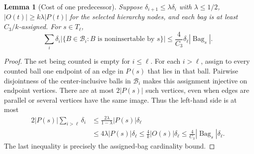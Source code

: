 \documentclass[11pt]{amsart}
\newtheorem{lemma}[theorem]{Lemma}
\theoremstyle{definition}
\theoremstyle{remark}
\numberwithin{equation}{section}
\begin{document}
\begin{lemma}[Cost of one predecessor]\label{ha:pruning}
Suppose $\delta_{i+1}\le\lambda\delta_i$ with $\lambda\le1/2$,
$|O(t)|\ge k\lambda|P(t)|$ for the selected hierarchy nodes, and each
bag is at least $C_3/k$-assigned.  For $s\in T_\ell$,
\[
 \sum_i\delta_i
   |\{B\in\mathcal B_i:B\text{ is noninsertable by }s\}|
 \le \frac{4}{C_3}\delta_\ell|\operatorname{Bag}_s|.
\]
\end{lemma}
\begin{proof}
The set being counted is empty for $i\le\ell$.  For each $i>\ell$,
assign to every counted ball one endpoint of an edge in $P(s)$ that
lies in that ball.  Pairwise disjointness of the center-inclusive
balls in $\mathcal B_i$ makes this assignment injective on endpoint
vertices.  There are at most $2|P(s)|$ such vertices, even when edges
are parallel or several vertices have the same image.  Thus the
left-hand side is at most
\begin{align*}
 2|P(s)|\sum_{i>\ell}\delta_i
 &\le \frac{2\lambda}{1-\lambda}|P(s)|\delta_\ell\\
 &\le 4\lambda|P(s)|\delta_\ell
 \le \frac{4}{k}|O(s)|\delta_\ell
 \le \frac{4}{C_3}|\operatorname{Bag}_s|\delta_\ell.
\end{align*}
The last inequality is precisely the assigned-bag cardinality bound.
\end{proof}
\end{document}
